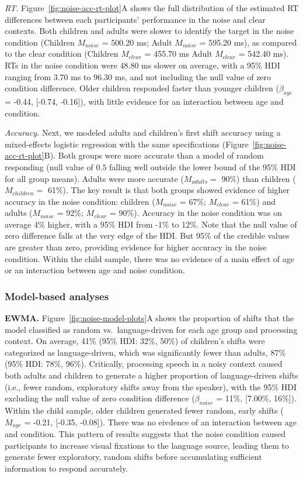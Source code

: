 \documentclass[english,floatsintext,man]{apa6}
\begin{document}
\emph{RT.} Figure~\ref{fig:noise-acc-rt-plot}A shows the full
distribution of the estimated RT differences between each participants'
performance in the noise and clear contexts. Both children and adults
were slower to identify the target in the noise condition (Children
\(M_{noise}\) = 500.20 ms; Adult \(M_{noise}\) = 595.20 ms), as compared
to the clear condition (Children \(M_{clear}\) = 455.70 ms Adult
\(M_{clear}\) = 542.40 ms). RTs in the noise condition were 48.80 ms
slower on average, with a 95\% HDI ranging from 3.70 ms to 96.30 ms, and
not including the null value of zero condition difference. Older
children responded faster than younger children (\(\beta_{age}\) =
-0.44, {[}-0.74, -0.16{]}), with little evidence for an interaction
between age and condition.

\emph{Accuracy.} Next, we modeled adults and children's first shift
accuracy using a mixed-effects logistic regression with the same
specifications (Figure~\ref{fig:noise-acc-rt-plot}B). Both groups were
more accurate than a model of random responding (null value of \(0.5\)
falling well outside the lower bound of the 95\% HDI for all group
means). Adults were more accurate (\(M_{adults} =\) 90\%) than children
(\(M_{children} =\) 61\%). The key result is that both groups showed
evidence of higher accuracy in the noise condition: children
(\(M_{noise}\) = 67\%; \(M_{clear}\) = 61\%) and adults (\(M_{noise}\) =
92\%; \(M_{clear}\) = 90\%). Accuracy in the noise condition was on
average 4\% higher, with a 95\% HDI from -1\% to 12\%. Note that the
null value of zero difference falls at the very edge of the HDI. But
95\% of the credible values are greater than zero, providing evidence
for higher accuracy in the noise condition. Within the child sample,
there was no evidence of a main effect of age or an interaction between
age and noise condition.

\hypertarget{model-based-analyses-1}{%
\subsubsection{Model-based analyses}\label{model-based-analyses-1}}

\textbf{EWMA.} Figure~\ref{fig:noise-model-plots}A shows the proportion
of shifts that the model classified as random vs.~language-driven for
each age group and processing context. On average, 41\% (95\% HDI: 32\%,
50\%) of children's shifts were categorized as language-driven, which
was significantly fewer than adults, 87\% (95\% HDI: 78\%, 96\%).
Critically, processing speech in a noisy context caused both adults and
children to generate a higher proportion of language-driven shifts
(i.e., fewer random, exploratory shifts away from the speaker), with the
95\% HDI excluding the null value of zero condition difference
(\(\beta_{noise}\) = 11\%, {[}7.00\%, 16\%{]}). Within the child sample,
older children generated fewer random, early shifts (\(M_{age}\) =
-0.21, {[}-0.35, -0.08{]}). There was no eivdence of an interaction
between age and condition. This pattern of results suggests that the
noise condition caused participants to increase visual fixations to the
language source, leading them to generate fewer exploratory, random
shifts before accumulating sufficient information to respond accurately.
\end{document}
